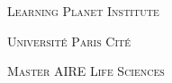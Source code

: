 \documentclass[11pt,a4paper]{article}
\begin{document}





\begin{titlepage}
    \centering
    
    {\scshape\Large Learning Planet Institute \par}
    {\scshape\Large Université Paris Cité \par}
    \vspace{0.5cm}
    {\scshape\Large Master AIRE Life Sciences \par}


\end{titlepage}
\end{document}
